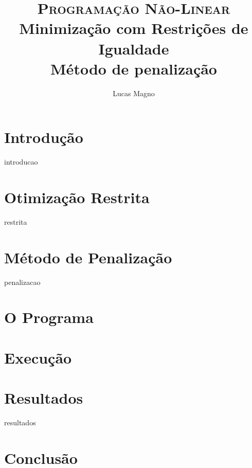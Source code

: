 \documentclass[paper=a4, fontsize=11pt]{scrartcl}	%
\title{
		\usefont{OT1}{bch}{b}{n}
		\normalfont \normalsize \textsc{Programação Não-Linear} \\ [25pt]
		\huge Minimização com Restrições de Igualdade \\
		\LARGE Método de penalização
}
\author{
		\normalfont 								\normalsize
        Lucas Magno\\[-3pt]		\normalsize
}
\date{}
\numberwithin{equation}{section}		%
\numberwithin{figure}{section}			%
\numberwithin{table}{section}				%
\begin{document}
\maketitle

\section{Introdução}
	{introducao}

\section{Otimização Restrita}
	{restrita}

\section{Método de Penalização}
	{penalizacao}
	
\section{O Programa}
\section{Execução}
\section{Resultados}
	{resultados}

\section{Conclusão}


\end{document}
